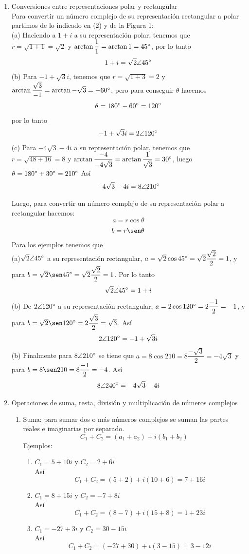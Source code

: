 \documentclass[a4paper,12pt]{article}
\begin{document}
\begin{enumerate}
	\item Conversiones entre representaciones polar y rectangular \\ Para convertir un número complejo de su representación rectangular a polar partimos de lo indicado en (2) y de la Figura 1: \\
	(a) Haciendo a $1 + i$ a su representación polar, tenemos que $r = \sqrt{1 + 1} = \sqrt{2}$ y $\arctan \dfrac{1}{1} = \arctan 1 = 45\degree$, por lo tanto \[1 + i = \sqrt{2} \angle 45\degree\] 
	(b) Para $-1 + \sqrt{3}i$, tenemos que $r = \sqrt{1 + 3} = 2$ y $\arctan \dfrac{\sqrt{3}}{-1} = \arctan -\sqrt{3} = -60\degree$, pero para conseguir $\theta$ hacemos \[\theta = 180\degree - 60\degree = 120\degree\] por lo tanto \[-1 + \sqrt{3}i = 2 \angle 120\degree\] 
	(c) Para $-4\sqrt{3} - 4i$ a su representación polar, tenemos que $r = \sqrt{48 + 16} = 8$ y $\arctan \dfrac{-4}{-4\sqrt{3}} = \arctan \dfrac{1}{\sqrt{3}} = 30\degree$, luego $\theta = 180\degree + 30\degree = 210\degree$ Así \[-4\sqrt{3} - 4i = 8 \angle 210\degree\] 

	Luego, para convertir un número complejo de su representación polar a rectangular hacemos: 
	\[a = r \cos \theta\]
	\[b = r \sen \theta\]
	Para los ejemplos tenemos que \\
	(a)$\sqrt{2} \angle 45\degree$ a su representación rectangular, $a = \sqrt{2} \cos 45\degree = \sqrt{2} \dfrac{\sqrt{2}}{2} = 1$, y para $b = \sqrt{2} \sen 45\degree = \sqrt{2} \dfrac{\sqrt{2}}{2} = 1$. Por lo tanto \[\sqrt{2} \angle 45\degree = 1 + i\]
	(b) De $2 \angle 120\degree$ a su representación rectangular, $a = 2 \cos 120\degree = 2 \dfrac{-1}{2} = -1$, y para $b = \sqrt{2} \sen 120\degree = 2 \dfrac{\sqrt{3}}{2} = \sqrt{3}$. Así \[ 2 \angle 120\degree = -1 + \sqrt{3}i\]
	(b) Finalmente para $8 \angle 210\degree$ se tiene que $a = 8 \cos 210 = 8 \dfrac{-\sqrt{3}}{2} = -4\sqrt{3}$ y para $b = 8 \sen 210 = 8 \dfrac{-1}{2} = -4$. Así \[8 \angle 240\degree = -4\sqrt{3} -4i\]
	\vspace{0.5cm}

	\item Operaciones de suma, resta, división y multiplicación de números complejos \\ 
	
	\begin{enumerate}
		\item Suma: para sumar dos o más números complejos se suman las partes reales e imaginarias por separado.
		\[C_1 + C_2 = (a_1 + a_2) + i(b_1 + b_2)\]
		Ejemplos:\\
		\begin{enumerate}
			\item $C_1 = 5+10i$ y $C_2 = 2+6i$ \\
			Así \[C_1 + C_2 = (5+2) + i(10+6) = 7 + 16i\]
			\item $C_1 = 8+15i$ y $C_2 = -7+8i$ \\
			Así \[C_1 + C_2 = (8-7) + i(15+8) = 1 + 23i\]
			\item $C_1 = -27+3i$ y $C_2 = 30-15i$ \\
			Así \[C_1 + C_2 = (-27+30) + i(3-15) = 3 - 12i\]
		\end{enumerate}


\end{enumerate}
\end{enumerate}
\end{document}
